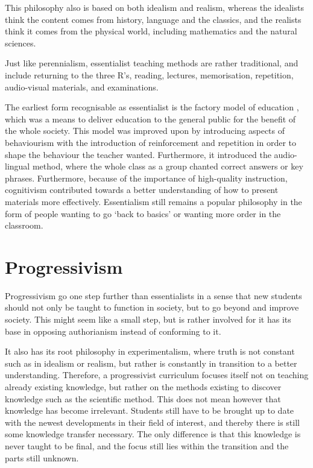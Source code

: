 This philosophy also is based on both idealism and realism, whereas the idealists think the content comes from history, language and the classics, and the realists think it comes from the physical world, including mathematics and the natural sciences.

Just like perennialism, essentialist teaching methods are rather traditional, and include returning to the three R's, reading, lectures, memorisation, repetition, audio-visual materials, and examinations.

The earliest form recognisable as essentialist is the factory model of education \cite{honours}, which was a means to deliver education to the general public for the benefit of the whole society. This model was improved upon by introducing aspects of behaviourism with the introduction of reinforcement and repetition in order to shape the behaviour the teacher wanted. Furthermore, it introduced the audio-lingual method, where the whole class as a group chanted correct answers or key phrases. Furthermore, because of the importance of high-quality instruction, cognitivism contributed towards a better understanding of how to present materials more effectively. Essentialism still remains a popular philosophy in the form of people wanting to go `back to basics' or wanting more order in the classroom.

\section{Progressivism}

Progressivism go one step further than essentialists in a sense that new students should not only be taught to function in society, but to go beyond and improve society. This might seem like a small step, but is rather involved for it has its base in opposing authorianism instead of conforming to it.

It also has its root philosophy in experimentalism, where truth is not constant such as in idealism or realism, but rather is constantly in transition to a better understanding. Therefore, a progressivist curriculum focuses itself not on teaching already existing knowledge, but rather on the methods existing to discover knowledge such as the scientific method. This does not mean however that knowledge has become irrelevant. Students still have to be brought up to date with the newest developments in their field of interest, and thereby there is still some knowledge transfer necessary. The only difference is that this knowledge is never taught to be final, and the focus still lies within the transition and the parts still unknown.

